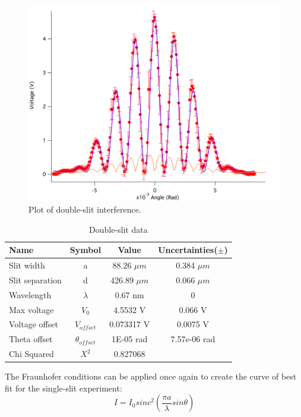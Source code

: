 \documentclass[prb,preprint]{revtex4-1}
\begin{document}
\begin{figure}[h]
\centering
\includegraphics[width=7in]{double.png}
\caption{Plot of double-slit interference.}
\label{double}
\end{figure}

\begin{table}[h]
\centering
\caption{Double-slit data}
\begin{ruledtabular}
\begin{tabular}{ l c c c}
Name & Symbol & Value & Uncertainties($\pm$)\\
\hline
Slit width & a & 88.26 $\mu m$ & 0.384 $\mu m$\\
Slit separation & d & 426.89 $\mu m$ & 0.066 $\mu m$\\
Wavelength & $\lambda$ & 0.67 nm & 0\\
Max voltage & $V_0$ & 4.5532 V & 0.066 V\\
Voltage offset & $V_{offset}$ & 0.073317 V & 0.0075 V\\
Theta offset &$ \theta_{offset}$ & 1E-05 rad & 7.57e-06 rad \\
\hline
Chi Squared & $X^2$ & 0.827068&
\end{tabular}
\end{ruledtabular}
\label{data}
\end{table}

\newpage

The Fraunhofer conditions can be applied once again to create  the curve of best fit for the single-slit experiment: 
\begin{equation}
I=I_0 sinc^2 (\frac{\pi a}{\lambda} sin\theta)
\label{eq2}
\end{equation}
\end{document}
